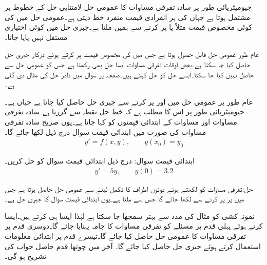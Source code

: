 جیومیٹریائی طور پر سادہ تفرقی مساوات کا عمومی حل لامتناہی حل کے خطوط پر مشتمل ہوتا ہے جہاں  کی ہر انفرادی قیمت منفرد خط دیتی ہے۔عمومی حل میں  کی کوئی مخصوص قیمت مثلاً  یا  پر کرنے سے ہمیں  ملتا ہے۔جبری حل میں کوئی اختیاری مستقل نہیں پایا جاتا۔

عام طور عمومی حل قابل حصول ہوتا ہے جس میں  کی مخصوص قیمت پر کرتے ہوئے درکار جبری حل حاصل کیا جا سکتا ہے۔بعض اوقات تفرقی مساوات ایسا حل بھی رکھتا ہے جس کو عمومی حل سے حاصل نہیں کیا جا سکتا۔ایسے حل کو  حل کہتے ہیں۔صفحہ  پر سوال  میں نادر حل کی مثال دی گئی ہے۔

عام طور پر عمومی حل میں   اور  پر کرنے سے جبری حل حاصل کیا جاتا ہے جہاں    ہے۔جیومیٹریائی طور پر اس کا مطلب ہے کہ خط حل نقطہ  سے گزرتا ہے۔سادہ تفرقی مساوات اور مساوات کے ابتدائی قیمتوں کو  کہا جاتا ہے۔یوں صریح سادہ تفرقی مساوات کی صورت میں ابتدائی قیمت سوال درج ذیل لکھا جائے گا۔
\begin{align}
y'=f(x,y), \quad \quad y(x_0)=y_0
\end{align}

ابتدائی قیمت سوال: درج ذیل ابتدائی قیمت سوال کو حل کریں۔
\begin{align*}
y'=5y,\quad \quad y(0)=3.2
\end{align*}

حل:تفرقی مساوات کو  لکھتے ہوئے دونوں اطراف کا تکمل لینے سے  عمومی حل حاصل ہوتا ہے جس میں  پر  پر کرنے سے  لکھا جائے گا جس سے  ملتا ہے۔یوں ابتدائی قیمت سوال کا جبری حل  ہے۔

نمونہ کشی کو مثال کی مدد سے بہتر سمجھا جا سکتا ہے لہٰذا ایسا ہی کرتے ہیں۔ایسا کرتے ہوئے پہلی قدم پر  مسئلے کو تفرقی مساوات کا جامہ پہنایا جائے گا۔دوسری قدم پر تفرقی مساوات کا عمومی حل حاصل کیا جائے گا۔تیسرے قدم پر ابتدائی معلومات استعمال کرتے ہوئے جبری حل حاصل کیا جائے گا۔ آخر میں چوتھا قدم حاصل جواب کی تشریح ہو گی۔ 


